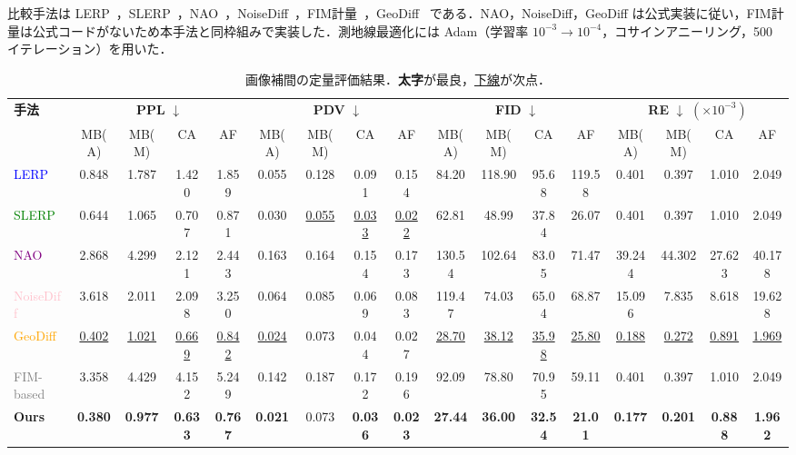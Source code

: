 \documentclass[MIRU,submit]{miru2026j}
\theoremstyle{definition}
\begin{document}
比較手法は LERP~\cite{Ho2020}，SLERP~\cite{Shoemake1985}，NAO~\cite{Park2023a}，NoiseDiff~\cite{Zheng2024}，FIM計量~\cite{Azeglio2025}，GeoDiff~\cite{Yu2025} である．NAO，NoiseDiff，GeoDiff は公式実装に従い，FIM計量は公式コードがないため本手法と同枠組みで実装した．測地線最適化には Adam（学習率 $10^{-3} \to 10^{-4}$，コサインアニーリング，500 イテレーション）を用いた．

\begin{table}[t]
    \centering
    \scriptsize
    \caption{画像補間の定量評価結果．\textbf{太字}が最良，\underline{下線}が次点．}
    \label{tab:main_results}
    \setlength{\tabcolsep}{1.92pt}
    \begin{tabular}{l cccc cccc cccc cccc}
        \toprule
        \textbf{手法} &
            \multicolumn{4}{c}{\textbf{PPL} $\downarrow$} &
            \multicolumn{4}{c}{\textbf{PDV} $\downarrow$} &
            \multicolumn{4}{c}{\textbf{FID} $\downarrow$} &
            \multicolumn{4}{c}{\textbf{RE} $\downarrow$ $(\times10^{-3})$} \\
        \cmidrule(lr){2-5}\cmidrule(lr){6-9}\cmidrule(lr){10-13}\cmidrule(lr){14-17}
         & MB(A) & MB(M) & CA & AF & MB(A) & MB(M) & CA & AF & MB(A) & MB(M) & CA & AF & MB(A) & MB(M) & CA & AF \\
        \midrule
        \textcolor{BLUE}{LERP}      & 0.848 & 1.787 & 1.420 & 1.859 & 0.055 & 0.128 & 0.091 & 0.154 &  84.20 & 118.90 &  95.68 & 119.58 & 0.401 & 0.397 & 1.010 & 2.049 \\
        \textcolor{GREEN}{SLERP}     & 0.644 & 1.065 & 0.707 & 0.871 & 0.030 & \underline{0.055} & \underline{0.033} & \underline{0.022} &  62.81 &  48.99 &  37.84 &  26.07 & 0.401 & 0.397 & 1.010 & 2.049 \\
        \textcolor{PURPLE}{NAO}       & 2.868 & 4.299 & 2.121 & 2.443 & 0.163 & 0.164 & 0.154 & 0.173 & 130.54 & 102.64 &  83.05 &  71.47 & 39.244 & 44.302 & 27.623 & 40.178 \\
        \textcolor{PINK}{NoiseDiff} & 3.618 & 2.011 & 2.098 & 3.250 & 0.064 & 0.085 & 0.069 & 0.083 & 119.47 &  74.03 &  65.04 &  68.87 & 15.096 & 7.835 & 8.618 & 19.628 \\
        \textcolor{ORANGE}{GeoDiff}   & \underline{0.402} & \underline{1.021} & \underline{0.669} & \underline{0.842} & \underline{0.024} & 0.073 & 0.044 & 0.027 & \underline{28.70} & \underline{38.12} & \underline{35.98} & \underline{25.80} & \underline{0.188} & \underline{0.272} & \underline{0.891} & \underline{1.969} \\
        \textcolor{GRAY}{FIM-based} & 3.358 & 4.429 & 4.152 & 5.249 & 0.142 & 0.187 & 0.172 & 0.196 &  92.09 &  78.80 &  70.95 &  59.11 & 0.401 & 0.397 & 1.010 & 2.049 \\
        \midrule
        \textbf{Ours} & \textbf{0.380} & \textbf{0.977} & \textbf{0.633} & \textbf{0.767} & \textbf{0.021} & 0.073 & \textbf{0.036} & \textbf{0.023} & \textbf{27.44} & \textbf{36.00} & \textbf{32.54} & \textbf{21.01} & \textbf{0.177} & \textbf{0.201} & \textbf{0.888} & \textbf{1.962} \\
        \bottomrule
    \end{tabular}
\end{table}
\end{document}
